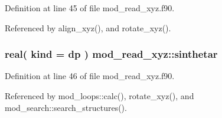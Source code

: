Definition at line 45 of file mod\+\_\+read\+\_\+xyz.\+f90.



Referenced by align\+\_\+xyz(), and rotate\+\_\+xyz().

\subsubsection[{\texorpdfstring{sinthetar}{sinthetar}}]{\setlength{\rightskip}{0pt plus 5cm}real( kind = dp ) mod\+\_\+read\+\_\+xyz\+::sinthetar}\hypertarget{namespacemod__read__xyz_ad3f08d13679d5f31c776b74f1abe0da5}{}\label{namespacemod__read__xyz_ad3f08d13679d5f31c776b74f1abe0da5}


Definition at line 46 of file mod\+\_\+read\+\_\+xyz.\+f90.



Referenced by mod\+\_\+loops\+::calc(), rotate\+\_\+xyz(), and mod\+\_\+search\+::search\+\_\+structures().

